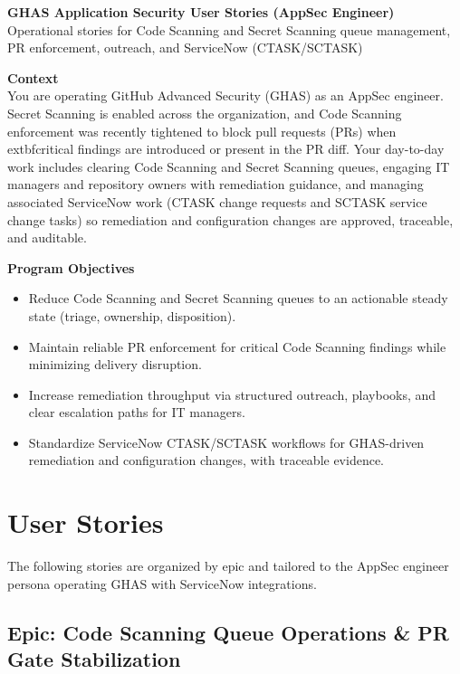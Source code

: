 \documentclass[11pt,a4paper]{article}
\begin{document}
\begin{center}
{\huge \textbf{GHAS Application Security User Stories (AppSec Engineer)}}\\[2pt]
\textcolor{Meta}{Operational stories for Code Scanning and Secret Scanning queue management, PR enforcement, outreach, and ServiceNow (CTASK/SCTASK)}\\[6pt]
\end{center}

\noindent\textbf{Context}\\
You are operating GitHub Advanced Security (GHAS) as an AppSec engineer. Secret Scanning is enabled across the organization, and Code Scanning enforcement was recently tightened to block pull requests (PRs) when 	extbf{critical} findings are introduced or present in the PR diff. Your day-to-day work includes clearing Code Scanning and Secret Scanning queues, engaging IT managers and repository owners with remediation guidance, and managing associated ServiceNow work (CTASK change requests and SCTASK service change tasks) so remediation and configuration changes are approved, traceable, and auditable.

\medskip
\noindent\textbf{Program Objectives}
\begin{itemize}
  \item Reduce Code Scanning and Secret Scanning queues to an actionable steady state (triage, ownership, disposition).
  \item Maintain reliable PR enforcement for critical Code Scanning findings while minimizing delivery disruption.
  \item Increase remediation throughput via structured outreach, playbooks, and clear escalation paths for IT managers.
  \item Standardize ServiceNow CTASK/SCTASK workflows for GHAS-driven remediation and configuration changes, with traceable evidence.
\end{itemize}

\section{User Stories}
\noindent The following stories are organized by epic and tailored to the AppSec engineer persona operating GHAS with ServiceNow integrations.

\subsection*{Epic: Code Scanning Queue Operations \& PR Gate Stabilization}
\end{document}
